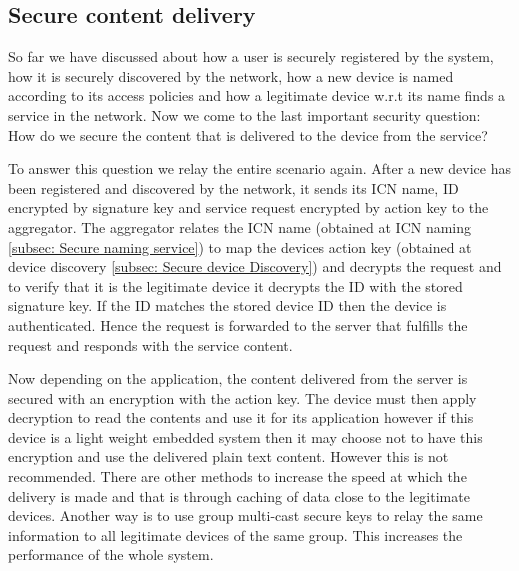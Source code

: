 \subsection{Secure content delivery}
So far we have discussed about how a user is securely registered by the system, how it is securely discovered by the network, how a new device is named according to its access policies and how a legitimate device w.r.t its name finds a service in the network. Now we come to the last important security question: How do we secure the content that is delivered to the device from the service? \par 
To answer this question we relay the entire scenario again. After a new device has been registered and discovered by the network, it sends its ICN name, ID encrypted by signature key and service request encrypted by action key to the aggregator. The aggregator relates the ICN name (obtained at ICN naming \ref{subsec: Secure naming service}) to map the devices action key (obtained at device discovery \ref{subsec: Secure device Discovery}) and decrypts the request and to verify that it is the legitimate device it decrypts the ID with the stored signature key. If the ID matches the stored device ID then the device is authenticated. Hence the request is forwarded to the server that fulfills the request and responds with the service content. \par
Now depending on the application, the content delivered from the server is secured with an encryption with the action key. The device must then apply decryption to read the contents and use it for its application however if this device is a light weight embedded system then it may choose not to have this encryption and use the delivered plain text content. However this is not recommended. There are other methods to increase the speed at which the delivery is made and that is through caching of data close to the legitimate devices. Another way is to use group multi-cast secure keys to relay the same information to all legitimate devices of the same group. This increases the performance of the whole system.

